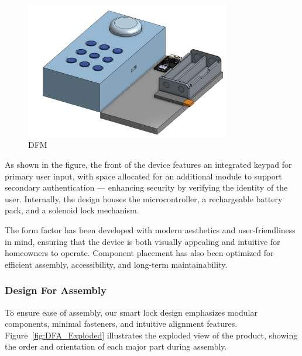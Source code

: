 \begin{figure}[!ht]
    \centering
    \includegraphics[width=0.80\textwidth]{img/DFM side view.png}
    \caption{DFM}
    \label{fig:DFM}
\end{figure}

As shown in the figure, the front of the device features an integrated keypad for primary user input, with space allocated for an additional module to support secondary authentication — enhancing security by verifying the identity of the user. Internally, the design houses the microcontroller, a rechargeable battery pack, and a solenoid lock mechanism.

The form factor has been developed with modern aesthetics and user-friendliness in mind, ensuring that the device is both visually appealing and intuitive for homeowners to operate. Component placement has also been optimized for efficient assembly, accessibility, and long-term maintainability.

\subsubsection*{Design For Assembly}
To ensure ease of assembly, our smart lock design emphasizes modular components, minimal fasteners, and intuitive alignment features. Figure~\ref{fig:DFA_Exploded} illustrates the exploded view of the product, showing the order and orientation of each major part during assembly.

